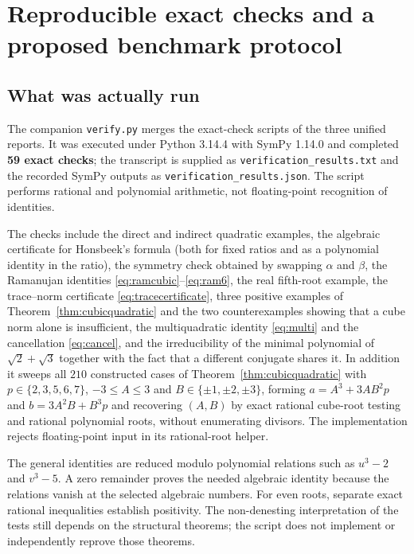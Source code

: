 \documentclass[11pt,oneside]{article}
\numberwithin{equation}{section}
\theoremstyle{definition}
\theoremstyle{remark}
\begin{document}
\section{Reproducible exact checks and a proposed benchmark protocol}\label{sec:verification}

\subsection{What was actually run}
The companion \texttt{verify.py} merges the exact-check scripts of the three unified reports. It was executed under Python 3.14.4 with SymPy 1.14.0 and completed \textbf{59 exact checks}; the transcript is supplied as \texttt{verification\_results.txt} and the recorded SymPy outputs as \texttt{verification\_results.json}. The script performs rational and polynomial arithmetic, not floating-point recognition of identities.

The checks include the direct and indirect quadratic examples, the algebraic certificate for Honsbeek's formula (both for fixed ratios and as a polynomial identity in the ratio), the symmetry check obtained by swapping $\alpha$ and $\beta$, the Ramanujan identities \eqref{eq:ramcubic}--\eqref{eq:ram6}, the real fifth-root example, the trace--norm certificate \eqref{eq:tracecertificate}, three positive examples of Theorem~\ref{thm:cubicquadratic} and the two counterexamples showing that a cube norm alone is insufficient, the multiquadratic identity \eqref{eq:multi} and the cancellation \eqref{eq:cancel}, and the irreducibility of the minimal polynomial of $\sqrt2+\sqrt3$ together with the fact that a different conjugate shares it. In addition it sweeps all $210$ constructed cases of Theorem~\ref{thm:cubicquadratic} with $p\in\{2,3,5,6,7\}$, $-3\le A\le3$ and $B\in\{\pm1,\pm2,\pm3\}$, forming $a=A^3+3AB^2p$ and $b=3A^2B+B^3p$ and recovering $(A,B)$ by exact rational cube-root testing and rational polynomial roots, without enumerating divisors. The implementation rejects floating-point input in its rational-root helper.

The general identities are reduced modulo polynomial relations such as $u^3-2$ and $v^3-5$. A zero remainder proves the needed algebraic identity because the relations vanish at the selected algebraic numbers. For even roots, separate exact rational inequalities establish positivity. The non-denesting interpretation of the tests still depends on the structural theorems; the script does not implement or independently reprove those theorems.
\end{document}
